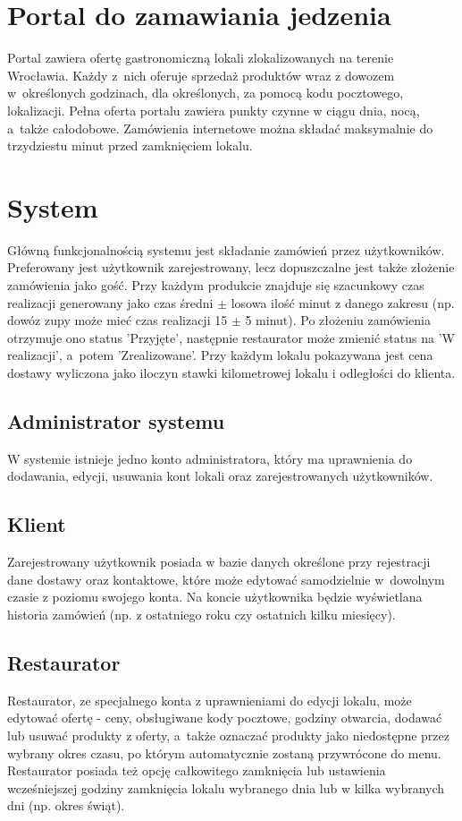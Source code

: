 \documentclass[12pt, a4paper, oneside]{article}
\begin{document}
\section{Portal do zamawiania jedzenia}
\indent\indent Portal zawiera ofertę gastronomiczną lokali zlokalizowanych na terenie Wrocławia. Każdy z~nich oferuje sprzedaż produktów wraz z dowozem w~określonych godzinach, dla określonych, za pomocą kodu pocztowego, lokalizacji. Pełna oferta portalu zawiera punkty czynne w ciągu dnia, nocą, a~także całodobowe. Zamówienia internetowe można składać maksymalnie do trzydziestu minut przed zamknięciem lokalu.
\section{System}
\indent\indent Główną funkcjonalnością systemu jest składanie zamówień przez użytkowników. Preferowany jest użytkownik zarejestrowany, lecz dopuszczalne jest także złożenie zamówienia jako gość. Przy każdym produkcie znajduje się szacunkowy czas realizacji generowany jako czas średni $\pm$ losowa ilość minut z danego zakresu (np. dowóz zupy może mieć czas realizacji 15 $\pm$ 5 minut). Po złożeniu zamówienia otrzymuje ono status 'Przyjęte', następnie restaurator może zmienić status na 'W realizacji', a~potem 'Zrealizowane'. Przy każdym lokalu pokazywana jest cena dostawy wyliczona jako iloczyn stawki kilometrowej lokalu i odległości do klienta.
\subsection{Administrator systemu}
\indent\indent W systemie istnieje jedno konto administratora, który ma uprawnienia do dodawania, edycji, usuwania kont lokali oraz zarejestrowanych użytkowników.
\subsection{Klient}
\indent\indent Zarejestrowany użytkownik posiada w bazie danych określone przy rejestracji dane dostawy oraz kontaktowe, które może edytować samodzielnie w~dowolnym czasie z poziomu swojego konta. Na koncie użytkownika będzie wyświetlana historia zamówień (np. z ostatniego roku czy ostatnich kilku miesięcy).
\subsection{Restaurator}
\indent\indent Restaurator, ze specjalnego konta z uprawnieniami do edycji lokalu, może edytować ofertę - ceny, obsługiwane kody pocztowe, godziny otwarcia, dodawać lub usuwać produkty z oferty, a~także oznaczać produkty jako niedostępne przez wybrany okres czasu, po którym automatycznie zostaną przywrócone do menu. Restaurator posiada też opcję całkowitego zamknięcia lub ustawienia wcześniejszej godziny zamknięcia lokalu wybranego dnia lub w kilka wybranych dni (np. okres świąt).
\end{document}
